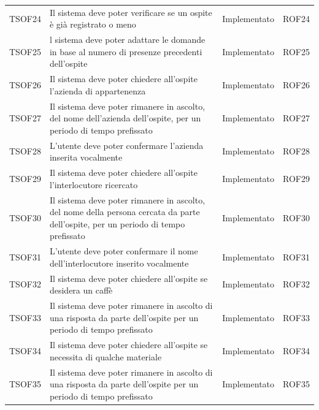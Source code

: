\documentclass[../PianoDiQualifica_v4.0.0.tex]{subfiles}
\begin{document}
\begin{longtable}[c] { >{\centering\arraybackslash}p{2cm} p{7cm} >{\centering\arraybackslash}p{4cm} >{\centering\arraybackslash}p{2cm}}
			\addlinespace[0.3em]
			\midrule
			\addlinespace[0.3em]
			TSOF24 & Il sistema deve poter verificare se un ospite è già registrato o meno & Implementato & ROF24\\
			\addlinespace[0.3em]
			\midrule
			\addlinespace[0.3em]
			TSOF25 & l sistema deve poter adattare le domande in base al numero di presenze precedenti dell'ospite & Implementato & ROF25 \\
			\addlinespace[0.3em]
			\midrule
			\addlinespace[0.3em]
			TSOF26 & Il sistema deve poter chiedere all'ospite l'azienda di appartenenza & Implementato & ROF26 \\
			\addlinespace[0.3em]
			\midrule
			\addlinespace[0.3em]
			TSOF27 & Il sistema deve poter rimanere in ascolto, del nome dell'azienda dell'ospite, per un periodo di tempo prefissato & Implementato & ROF27 \\
			\addlinespace[0.3em]
			\midrule
			\addlinespace[0.3em]
			TSOF28 & L'utente deve poter confermare l'azienda inserita vocalmente & Implementato & ROF28 \\
			\addlinespace[0.3em]
			\midrule
			\addlinespace[0.3em]
			TSOF29 & Il sistema deve poter chiedere all'ospite l'interlocutore ricercato & Implementato & ROF29 \\
			\addlinespace[0.3em]
			\midrule
			\addlinespace[0.3em]
			TSOF30 & Il sistema deve poter rimanere in ascolto, del nome della persona cercata da parte dell'ospite, per un periodo di tempo prefissato & Implementato & ROF30 \\
			\addlinespace[0.3em]
			\midrule
			\addlinespace[0.3em]
			TSOF31 & L'utente deve poter confermare il nome dell’interlocutore inserito vocalmente & Implementato & ROF31 \\
			\addlinespace[0.3em]
			\midrule
			\addlinespace[0.3em]
			TSOF32 & Il sistema deve poter chiedere all'ospite se desidera un caffè & Implementato & ROF32 \\
			\addlinespace[0.3em]
			\midrule
			\addlinespace[0.3em]
			TSOF33 & Il sistema deve poter rimanere in ascolto di una risposta da parte dell'ospite per un periodo di tempo prefissato	 & Implementato & ROF33 \\
			\addlinespace[0.3em]
			\midrule
			\addlinespace[0.3em]
			TSOF34 & Il sistema deve poter chiedere all'ospite se necessita di qualche materiale & Implementato & ROF34 \\
			\addlinespace[0.3em]
			\midrule
			\addlinespace[0.3em]
			TSOF35 & Il sistema deve poter rimanere in ascolto di una risposta da parte dell'ospite per un periodo di tempo prefissato & Implementato & ROF35 \\

\end{longtable}
\end{document}
